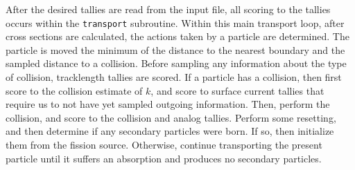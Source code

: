 \documentclass[10pt]{article}
\numberwithin{equation}{section} %
\begin{document}
After the desired tallies are read from the input file, all scoring to the tallies occurs within the {\tt transport} subroutine. Within this main transport loop, after cross sections are calculated, the actions taken by a particle are determined. The particle is moved the minimum of the distance to the nearest boundary and the sampled distance to a collision. Before sampling any information about the type of collision, tracklength tallies are scored. If a particle has a collision, then first score to the collision estimate of \(k\), and score to surface current tallies that require us to not have yet sampled outgoing information. Then, perform the collision, and score to the collision and analog tallies. Perform some resetting, and then determine if any secondary particles were born. If so, then initialize them from the fission source. Otherwise, continue transporting the present particle until it suffers an absorption and produces no secondary particles.
\end{document}
